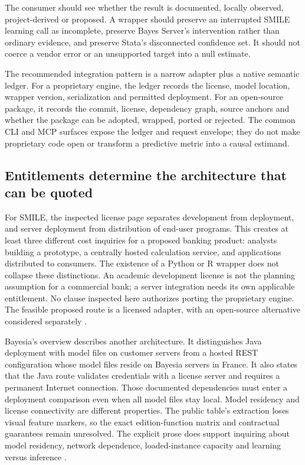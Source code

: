 The consumer should see whether the result is documented, locally observed,
project-derived or proposed. A wrapper should preserve an interrupted SMILE
learning call as incomplete, preserve Bayes Server's intervention rather than
ordinary evidence, and preserve Stata's disconnected confidence set. It should
not coerce a vendor error or an unsupported target into a null estimate.

The recommended integration pattern is a narrow adapter plus a native semantic
ledger. For a proprietary engine, the ledger records the license, model
location, wrapper version, serialization and permitted deployment. For an
open-source package, it records the commit, license, dependency graph, source
anchors and whether the package can be adopted, wrapped, ported or rejected.
The common CLI and MCP surfaces expose the ledger and request envelope; they do
not make proprietary code open or transform a predictive metric into a causal
estimand.

\subsection{Entitlements determine the architecture that can be quoted}
\label{exec17:s8-editions}

For SMILE, the inspected license page separates development from deployment,
and server deployment from distribution of end-user programs. This creates
at least three different cost inquiries for a proposed banking product:
analysts building a prototype, a centrally hosted calculation service, and
applications distributed to consumers. The existence of a Python or R wrapper
does not collapse these distinctions. An academic development license is not
the planning assumption for a commercial bank; a server integration needs
its own applicable entitlement. No clause inspected here authorizes porting
the proprietary engine. The feasible proposed route is a licensed adapter,
with an open-source alternative considered separately
\citep{exec13_smile_license}.

Bayesia's overview describes another architecture. It distinguishes Java
deployment with model files on customer servers from a hosted REST
configuration whose model files reside on Bayesia servers in France. It also
states that the Java route validates credentials with a license server and
requires a permanent Internet connection. Those documented dependencies must
enter a deployment comparison even when all model files stay local. Model
residency and license connectivity are different properties. The public table's
extraction loses visual feature markers, so the exact edition-function matrix
and contractual guarantees remain unresolved. The explicit prose does support
inquiring about model residency, network dependence, loaded-instance capacity
and learning versus inference \citep{exec13_bayesia_api}.

